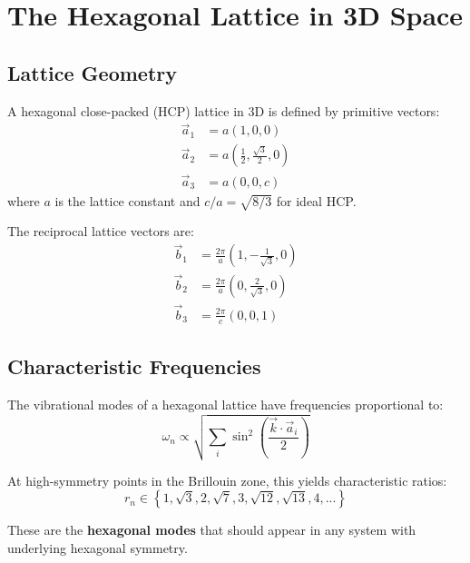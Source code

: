 \documentclass[12pt,a4paper]{article}
\begin{document}
\section{The Hexagonal Lattice in 3D Space}

\subsection{Lattice Geometry}

A hexagonal close-packed (HCP) lattice in 3D is defined by primitive vectors:
\begin{align}
    \vec{a}_1 &= a\left(1, 0, 0\right) \\
    \vec{a}_2 &= a\left(\frac{1}{2}, \frac{\sqrt{3}}{2}, 0\right) \\
    \vec{a}_3 &= a\left(0, 0, c\right)
\end{align}
where $a$ is the lattice constant and $c/a = \sqrt{8/3}$ for ideal HCP.

The reciprocal lattice vectors are:
\begin{align}
    \vec{b}_1 &= \frac{2\pi}{a}\left(1, -\frac{1}{\sqrt{3}}, 0\right) \\
    \vec{b}_2 &= \frac{2\pi}{a}\left(0, \frac{2}{\sqrt{3}}, 0\right) \\
    \vec{b}_3 &= \frac{2\pi}{c}\left(0, 0, 1\right)
\end{align}

\subsection{Characteristic Frequencies}

The vibrational modes of a hexagonal lattice have frequencies proportional to:
\begin{equation}
    \omega_n \propto \sqrt{\sum_{i} \sin^2\left(\frac{\vec{k} \cdot \vec{a}_i}{2}\right)}
\end{equation}

At high-symmetry points in the Brillouin zone, this yields characteristic ratios:
\begin{equation}
    \boxed{r_n \in \left\{1, \sqrt{3}, 2, \sqrt{7}, 3, \sqrt{12}, \sqrt{13}, 4, ...\right\}}
\end{equation}

These are the \textbf{hexagonal modes} that should appear in any system with underlying hexagonal symmetry.

\end{document}
